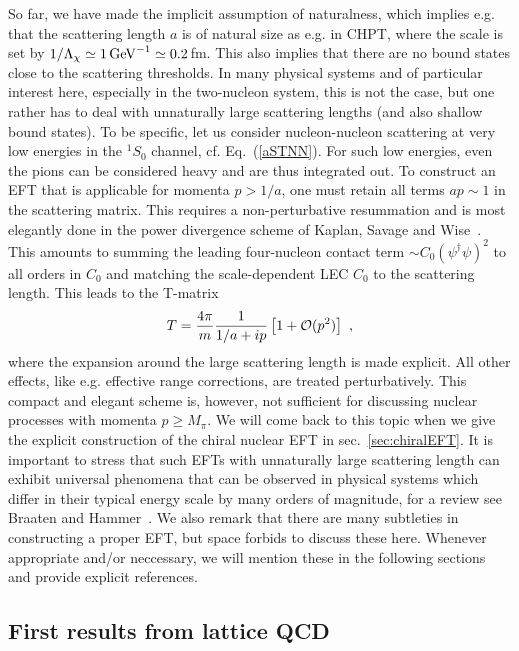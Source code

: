 \documentclass[aps,rmp,nofootinbib,twocolumn,floatfix]{revtex4}
\newcommand{\beq}{\begin{equation}}
\newcommand{\eeq}{\end{equation}}
\begin{document}
So far, we have made the implicit assumption of naturalness,
which implies e.g. that the scattering length $a$  
is of natural size as e.g. in CHPT, where the
scale is set by $1/\Lambda_\chi \simeq 1\, {\rm GeV}^{-1}\simeq 0.2\,$fm.
This also implies that there are no bound states close to the 
scattering thresholds. In many physical systems and of particular 
interest here, especially in the two-nucleon system, this is not the case, 
but one rather has to deal with unnaturally large scattering lengths (and
also shallow bound states). To be specific, let us consider nucleon-nucleon
scattering at very low energies in the $^1S_0$ channel, cf. Eq.~(\ref{aSTNN}).
For such low energies, even the pions can be considered heavy and are
thus integrated out. To construct an EFT that is applicable for momenta 
$p > 1/a$, one must retain all terms $a p \sim 1$ in the scattering matrix.  
This requires  a non-perturbative resummation and is most elegantly done
in the power divergence scheme of Kaplan, Savage and 
Wise~\cite{Kaplan:1998tg,Kaplan:1998we}. 
This amounts to summing the leading four-nucleon 
contact term $\sim C_0 (\psi^\dagger \psi)^2$
to all orders in $C_0$ and matching the scale-dependent LEC
$C_0$ to the scattering length. This leads to the T-matrix
\beq
T = \frac{4\pi}{m} \frac{1}{1/a + ip} \left[ 1 + {\cal O}(p^2)\right]~,
\eeq
where the expansion around the large scattering length is made explicit.
All other effects, like e.g. effective range corrections, are treated
perturbatively. This compact and elegant  scheme is, however, not
sufficient for discussing nuclear processes with momenta $p \ge M_\pi$.
We will come back to this topic when we give the explicit construction
of the chiral nuclear EFT in sec.~\ref{sec:chiralEFT}. It is important to 
stress that such EFTs with unnaturally large scattering length can exhibit
universal phenomena that can be observed in physical systems which differ
in their typical energy scale by many orders of magnitude, for a review
see Braaten and Hammer~\cite{Braaten:2004rn}.
We also remark that there are many subtleties in constructing a proper EFT, 
but space forbids to discuss these here. Whenever appropriate and/or
neccessary, we will mention these in the following sections and provide
explicit references. 


\subsection{First results from lattice QCD}
\label{sec:lattice}
\end{document}
